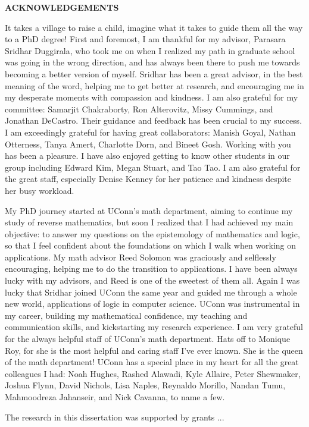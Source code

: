
\begin{center}
\vspace*{52pt}
{\textbf{ACKNOWLEDGEMENTS}}
\end{center}

It takes a village to raise a child, imagine what it takes to guide them all the way to a PhD degree!
%
First and foremost, I am thankful for my advisor, Parasara Sridhar Duggirala, who took me on when I realized my path in graduate school was going in the wrong direction, and has always been there to push me towards becoming a better version of myself.
%
Sridhar has been a great advisor, in the best meaning of the word, helping me to get better at research, and encouraging me in my desperate moments with compassion and kindness.
%
I am also grateful for my committee: Samarjit Chakraborty, Ron Alterovitz, Missy Cummings, and Jonathan DeCastro. Their guidance and feedback has been crucial to my success.
%
I am exceedingly grateful for having great collaborators: Manish Goyal, Nathan Otterness, Tanya Amert, Charlotte Dorn, and Bineet Gosh.
%
Working with you has been a pleasure.
%
I have also enjoyed getting to know other students in our group including Edward Kim, Megan Stuart, and Tao Tao.
%
I am also grateful for the great staff, especially Denise Kenney for her patience and kindness despite her busy workload.


My PhD journey started at UConn's math department, aiming to continue my study of reverse mathematics, but soon I realized that I had achieved my main objective: to answer my questions on the epistemology of mathematics and logic, so that I feel confident about the foundations on which I walk when working on applications.
%
My math advisor Reed Solomon was graciously and selflessly encouraging, helping me to do the transition to applications.
%
I have been always lucky with my advisors, and Reed is one of the sweetest of them all.
%
Again I was lucky that Sridhar joined UConn the same year and guided me through a whole new world, applications of logic in computer science.
%
UConn was instrumental in my career, building my mathematical confidence, my teaching and communication skills, and kickstarting my research experience.
%
I am very grateful for the always helpful staff of UConn's math department.
%
Hats off to Monique Roy, for she is the most helpful and caring staff I've ever known.
%
She is the queen of the math department!
%
UConn has a special place in my heart for all the great colleagues I had: Noah Hughes, Rashed Alawadi, Kyle Allaire, Peter Shewmaker, Joshua Flynn, David Nichols, Lisa Naples, Reynaldo Morillo, Nandan Tumu, Mahmoodreza Jahanseir, and Nick Cavanna, to name a few.
%


The research in this dissertation was supported by grants ...


\clearpage
